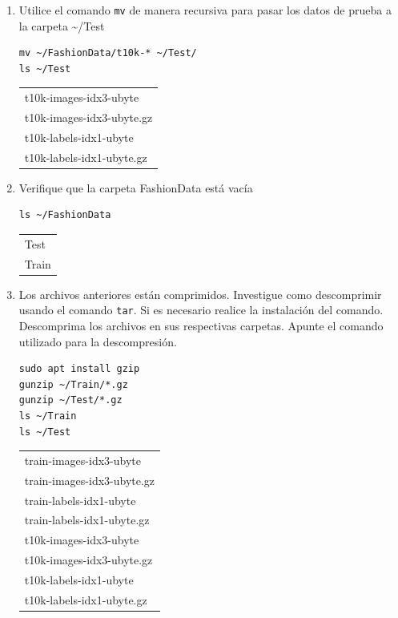 \documentclass{article}
\begin{document}
\begin{enumerate}
\item Utilice el comando \texttt{mv} de manera recursiva para pasar los datos de
prueba a la carpeta \textasciitilde{}/Test
\begin{verbatim}
mv ~/FashionData/t10k-* ~/Test/
ls ~/Test
\end{verbatim}

\begin{table}[htbp]
\label{tab:org06bea7e}
\centering
\begin{tabular}{l}
t10k-images-idx3-ubyte\\
t10k-images-idx3-ubyte.gz\\
t10k-labels-idx1-ubyte\\
t10k-labels-idx1-ubyte.gz\\
\end{tabular}
\end{table}

\item Verifique que la carpeta FashionData está vacía
\begin{verbatim}
ls ~/FashionData
\end{verbatim}

\begin{table}[htbp]
\label{tab:orgfb1cd98}
\centering
\begin{tabular}{l}
Test\\
Train\\
\end{tabular}
\end{table}

\item Los archivos anteriores están comprimidos. Investigue como
descomprimir usando el comando \texttt{tar}. Si es necesario realice la
instalación del comando. Descomprima los archivos en sus
respectivas carpetas. Apunte el comando utilizado para la descompresión.
\begin{verbatim}
sudo apt install gzip
gunzip ~/Train/*.gz
gunzip ~/Test/*.gz
ls ~/Train
ls ~/Test
\end{verbatim}

\begin{table}[htbp]
\label{tab:org431723f}
\centering
\begin{tabular}{l}
train-images-idx3-ubyte\\
train-images-idx3-ubyte.gz\\
train-labels-idx1-ubyte\\
train-labels-idx1-ubyte.gz\\
t10k-images-idx3-ubyte\\
t10k-images-idx3-ubyte.gz\\
t10k-labels-idx1-ubyte\\
t10k-labels-idx1-ubyte.gz\\
\end{tabular}
\end{table}


\end{enumerate}
\end{document}
